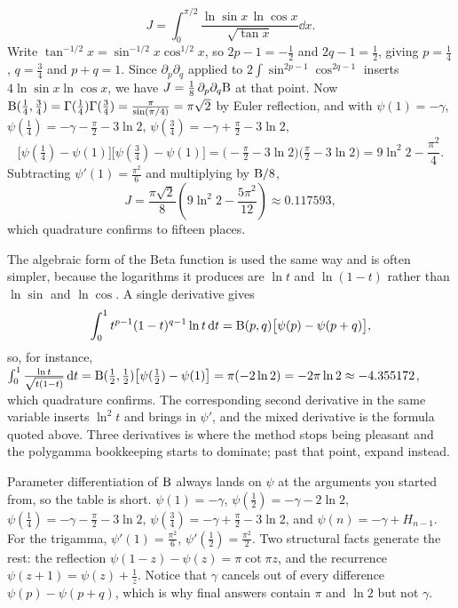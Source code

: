 \begin{worked}
\[J=\int_0^{\pi/2}\frac{\ln\sin x\,\ln\cos x}{\sqrt{\tan x}}\dd x.\]
Write $\tan^{-1/2}x=\sin^{-1/2}x\cos^{1/2}x$, so $2p-1=-\tfrac12$ and $2q-1=\tfrac12$, giving $p=\tfrac14$, $q=\tfrac34$ and $p+q=1$. Since $\partial_p\partial_q$ applied to $2\int\sin^{2p-1}\cos^{2q-1}$ inserts $4\ln\sin x\ln\cos x$, we have $J=\tfrac18\,\partial_p\partial_q\mathrm{B}$ at that point. Now $\mathrm{B}(\tfrac14,\tfrac34)=\Gamma(\tfrac14)\Gamma(\tfrac34)=\frac{\pi}{\sin(\pi/4)}=\pi\sqrt2$ by Euler reflection, and with $\psi(1)=-\gamma$, $\psi(\tfrac14)=-\gamma-\tfrac{\pi}{2}-3\ln2$, $\psi(\tfrac34)=-\gamma+\tfrac{\pi}{2}-3\ln2$,
\[\bigl[\psi(\tfrac14)-\psi(1)\bigr]\bigl[\psi(\tfrac34)-\psi(1)\bigr]=\bigl(-\tfrac{\pi}{2}-3\ln2\bigr)\bigl(\tfrac{\pi}{2}-3\ln2\bigr)=9\ln^{2}2-\frac{\pi^{2}}{4}.\]
Subtracting $\psi'(1)=\tfrac{\pi^{2}}{6}$ and multiplying by $\mathrm{B}/8$,
\[J=\frac{\pi\sqrt2}{8}\left(9\ln^{2}2-\frac{5\pi^{2}}{12}\right)\approx0.117593,\]
which quadrature confirms to fifteen places.
\end{worked}

The algebraic form of the Beta function is used the same way and is often simpler, because the logarithms it produces are $\ln t$ and $\ln(1-t)$ rather than $\ln\sin$ and $\ln\cos$. A single derivative gives
\[\int_0^1t^{p-1}(1-t)^{q-1}\ln t\,\mathrm{d} t=\mathrm{B}(p,q)\bigl[\psi(p)-\psi(p+q)\bigr],\]
so, for instance, $\int_0^1\frac{\ln t}{\sqrt{t(1-t)}}\,\mathrm{d} t=\mathrm{B}(\tfrac12,\tfrac12)\bigl[\psi(\tfrac12)-\psi(1)\bigr]=\pi(-2\ln2)=-2\pi\ln2\approx-4.355172$, which quadrature confirms. The corresponding second derivative in the same variable inserts $\ln^{2}t$ and brings in $\psi'$, and the mixed derivative is the formula quoted above. Three derivatives is where the method stops being pleasant and the polygamma bookkeeping starts to dominate; past that point, expand instead.

\begin{keynote}
Parameter differentiation of $\mathrm{B}$ always lands on $\psi$ at the arguments you started from, so the table is short. $\psi(1)=-\gamma$, $\psi(\tfrac12)=-\gamma-2\ln2$, $\psi(\tfrac14)=-\gamma-\tfrac{\pi}{2}-3\ln2$, $\psi(\tfrac34)=-\gamma+\tfrac{\pi}{2}-3\ln2$, and $\psi(n)=-\gamma+H_{n-1}$. For the trigamma, $\psi'(1)=\tfrac{\pi^{2}}{6}$, $\psi'(\tfrac12)=\tfrac{\pi^{2}}{2}$. Two structural facts generate the rest: the reflection $\psi(1-z)-\psi(z)=\pi\cot\pi z$, and the recurrence $\psi(z+1)=\psi(z)+\tfrac1z$. Notice that $\gamma$ cancels out of every difference $\psi(p)-\psi(p+q)$, which is why final answers contain $\pi$ and $\ln2$ but not $\gamma$.
\end{keynote}

